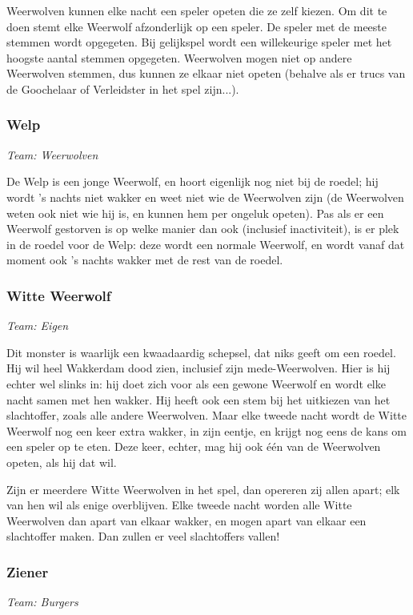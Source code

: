 \documentclass[12pt]{article}
\begin{document}
      Weerwolven kunnen elke nacht een speler opeten die ze zelf kiezen. Om dit te doen stemt elke Weerwolf afzonderlijk op een speler. De speler met de meeste stemmen wordt opgegeten. Bij gelijkspel wordt een willekeurige speler met het hoogste aantal stemmen opgegeten. Weerwolven mogen niet op andere Weerwolven stemmen, dus kunnen ze elkaar niet opeten (behalve als er trucs van de Goochelaar of Verleidster in het spel zijn...).

    \subsubsection{Welp}
      \emph{\scriptsize Team: Weerwolven}
    
      De Welp is een jonge Weerwolf, en hoort eigenlijk nog niet bij de roedel; hij wordt 's nachts niet wakker en weet niet wie de Weerwolven zijn (de Weerwolven weten ook niet wie hij is, en kunnen hem per ongeluk opeten). Pas als er een Weerwolf gestorven is op welke manier dan ook (inclusief inactiviteit), is er plek in de roedel voor de Welp: deze wordt een normale Weerwolf, en wordt vanaf dat moment ook 's nachts wakker met de rest van de roedel.
    
    \subsubsection{Witte Weerwolf}
      \emph{\scriptsize Team: Eigen}
    
      Dit monster is waarlijk een kwaadaardig schepsel, dat niks geeft om een roedel. Hij wil heel Wakkerdam dood zien, inclusief zijn mede-Weerwolven. Hier is hij echter wel slinks in: hij doet zich voor als een gewone Weerwolf en wordt elke nacht samen met hen wakker. Hij heeft ook een stem bij het uitkiezen van het slachtoffer, zoals alle andere Weerwolven. Maar elke tweede nacht wordt de Witte Weerwolf nog een keer extra wakker, in zijn eentje, en krijgt nog eens de kans om een speler op te eten. Deze keer, echter, mag hij ook \'e\'en van de Weerwolven opeten, als hij dat wil.
    
      Zijn er meerdere Witte Weerwolven in het spel, dan opereren zij allen apart; elk van hen wil als enige overblijven. Elke tweede nacht worden alle Witte Weerwolven dan apart van elkaar wakker, en mogen apart van elkaar een slachtoffer maken. Dan zullen er veel slachtoffers vallen!
    
    \subsubsection{Ziener}
      \emph{\scriptsize Team: Burgers}
    
\end{document}
